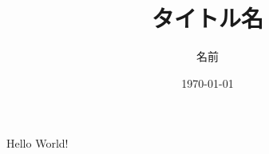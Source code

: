 \documentclass[uplatex]{jsarticle}
\title{タイトル名}
\author{名前}
\date{\today}
\begin{document}
    \maketitle
    Hello World!
\end{document}
